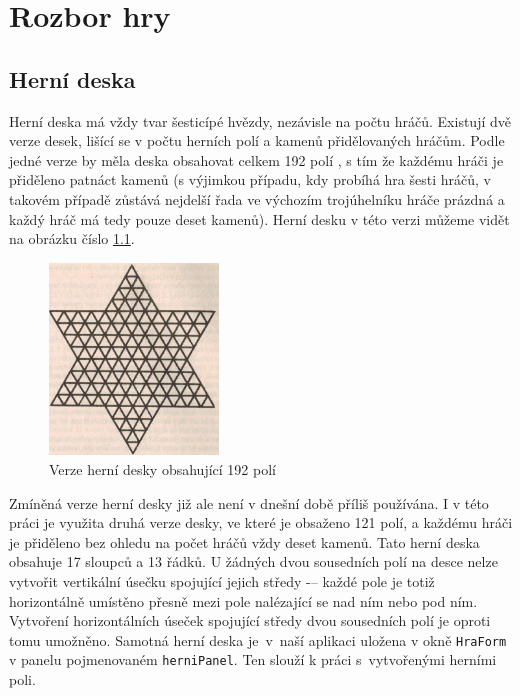\chapter{Rozbor hry}
\section{Herní deska}
Herní deska má vždy tvar šesticípé hvězdy, nezávisle na počtu hráčů. Existují dvě verze desek, lišící se v počtu herních polí a kamenů přidělovaných hráčům. Podle jedné verze by měla deska obsahovat celkem 192 polí \cite{zapletal}, s tím že každému hráči je přiděleno patnáct kamenů (s výjimkou případu, kdy probíhá hra šesti hráčů, v takovém případě zůstává nejdelší řada ve výchozím trojúhelníku hráče prázdná a každý hráč má tedy pouze deset kamenů). Herní desku v této verzi můžeme vidět na obrázku číslo \ref{fig:VerzeHerniDesky}.

\begin{figure}
	\centering
	\includegraphics[width=0.4\textwidth]{Figures/VerzeHerniDesky.png}
	\caption{Verze herní desky obsahující 192 polí \cite{zapletal}}
    \label{fig:VerzeHerniDesky}
\end{figure}

Zmíněná verze herní desky již ale není v dnešní době příliš používána. I v této práci je využita druhá verze desky, ve které je obsaženo 121 polí, a každému hráči je přiděleno bez ohledu na počet hráčů vždy deset kamenů. Tato herní deska obsahuje 17 sloupců a 13 řádků. U žádných dvou sousedních polí na desce nelze vytvořit vertikální úsečku spojující jejich středy -– každé pole je totiž horizontálně umístěno přesně mezi pole nalézající se nad ním nebo pod ním. Vytvoření horizontálních úseček spojující středy dvou sousedních polí je oproti tomu umožněno. Samotná herní deska je~v~naší aplikaci uložena v okně \lstinline$HraForm$ v panelu pojmenovaném \lstinline$herniPanel$. Ten slouží k práci s~vytvořenými herními poli.

